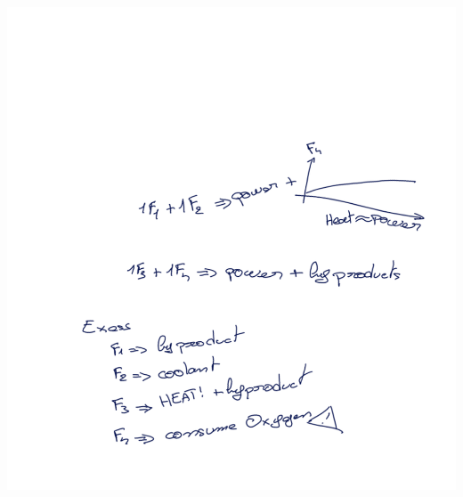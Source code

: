 \documentclass[12pt]{article}
\begin{document}
\newpage
\includegraphics[width=\linewidth]{images/notes.png}
\end{document}
